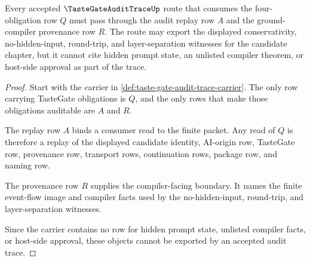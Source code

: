 \begin{theorem}
\label{thm:taste-gate-audit-trace-ground-compiler-boundary}
Every accepted $\TasteGateAuditTraceUp$ route that consumes the four-obligation row $Q$ must pass through the audit replay row $A$ and the ground-compiler provenance row $R$. The route may export the displayed conservativity, no-hidden-input, round-trip, and layer-separation witnesses for the candidate chapter, but it cannot cite hidden prompt state, an unlisted compiler theorem, or host-side approval as part of the trace.
\end{theorem}
\begin{proof}
Start with the carrier in \autoref{def:taste-gate-audit-trace-carrier}. The only row carrying TasteGate obligations is $Q$, and the only rows that make those obligations auditable are $A$ and $R$.

The replay row $A$ binds a consumer read to the finite packet. Any read of $Q$ is therefore a replay of the displayed candidate identity, AI-origin row, TasteGate row, provenance row, transport rows, continuation rows, package row, and naming row.

The provenance row $R$ supplies the compiler-facing boundary. It names the finite event-flow image and compiler facts used by the no-hidden-input, round-trip, and layer-separation witnesses.

Since the carrier contains no row for hidden prompt state, unlisted compiler facts, or host-side approval, these objects cannot be exported by an accepted audit trace.
\end{proof}

